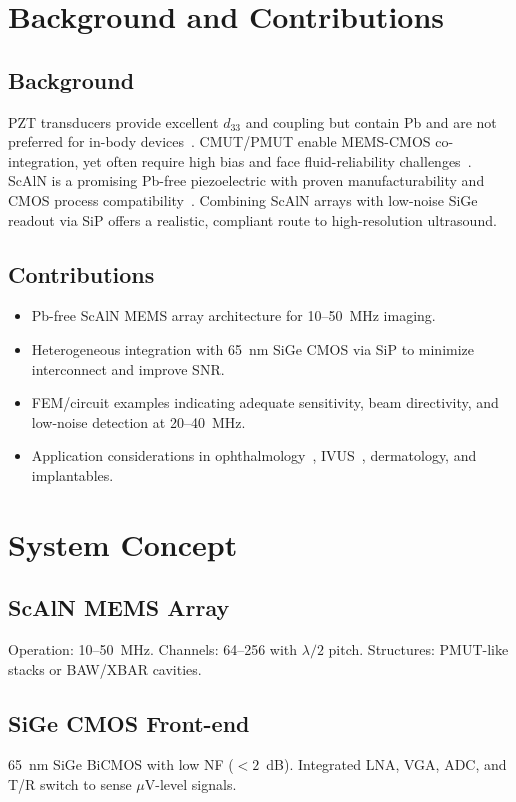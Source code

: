 \documentclass[conference]{IEEEtran}
\begin{document}
\section{Background and Contributions}
\subsection{Background}
PZT transducers provide excellent $d_{33}$ and coupling but contain Pb and are not preferred for in-body devices~\cite{akata2009pzt}. CMUT/PMUT enable MEMS-CMOS co-integration, yet often require high bias and face fluid-reliability challenges~\cite{khuri2009cmut}. ScAlN is a promising Pb-free piezoelectric with proven manufacturability and CMOS process compatibility~\cite{akrout2018scaln}. Combining ScAlN arrays with low-noise SiGe readout via SiP offers a realistic, compliant route to high-resolution ultrasound.

\subsection{Contributions}
\begin{itemize}
  \item Pb-free ScAlN MEMS array architecture for 10--50~MHz imaging.
  \item Heterogeneous integration with 65~nm SiGe CMOS via SiP to minimize interconnect and improve SNR.
  \item FEM/circuit examples indicating adequate sensitivity, beam directivity, and low-noise detection at 20--40~MHz.
  \item Application considerations in ophthalmology~\cite{pavlin2009ubm}, IVUS~\cite{foster2000ivus}, dermatology, and implantables.
\end{itemize}

\section{System Concept}
\subsection{ScAlN MEMS Array}
Operation: 10--50~MHz. Channels: 64--256 with $\lambda/2$ pitch. Structures: PMUT-like stacks or BAW/XBAR cavities.

\subsection{SiGe CMOS Front-end}
65~nm SiGe BiCMOS with low NF ($<2$~dB). Integrated LNA, VGA, ADC, and T/R switch to sense $\mu$V-level signals.
\end{document}
